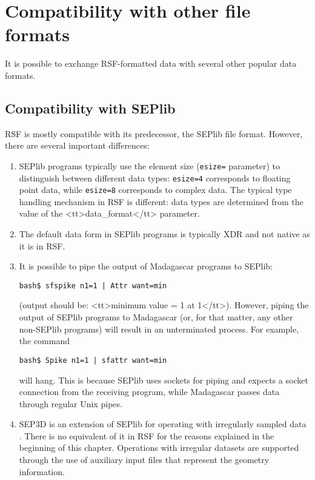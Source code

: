 \section{Compatibility with other file formats}

It is possible to exchange RSF-formatted data with several other popular data formats.

\subsection{Compatibility with SEPlib}

RSF is mostly compatible with its predecessor, the SEPlib file format.
However, there are several important differences:
\begin{enumerate}
\item SEPlib programs typically use the element size (\texttt{esize=}
parameter) to distinguish between different data types:
\texttt{esize=4} corresponds to floating point data, while
\texttt{esize=8} corresponds to complex data. The typical type
handling mechanism in RSF is different: 
data types are determined from the value of the <tt>data\_format</tt> parameter.
\item The default data form in SEPlib programs is
typically XDR and not native as it is in RSF. 
\item It is possible to pipe the
output of Madagascar programs to SEPlib:
\begin{verbatim}
bash$ sfspike n1=1 | Attr want=min
\end{verbatim}
(output should be: <tt>minimum value = 1 at 1</tt>).
However, piping the output of SEPlib programs to Madagascar (or, for that matter, any
other non-SEPlib programs) will result in an unterminated process. For example, the command
\begin{verbatim}
bash$ Spike n1=1 | sfattr want=min
\end{verbatim}
will hang. This is 
because SEPlib uses sockets for piping and expects a socket
connection from the receiving program, while Madagascar passes data through regular Unix
pipes.
\item SEP3D is an extension of SEPlib for operating with irregularly sampled
  data \cite[]{Biondi.sep.92.343}. There is no equivalent of it in RSF for
  the reasons explained in the beginning of this chapter. Operations with
  irregular datasets are supported through the use of auxiliary input files
  that represent the geometry information.
\end{enumerate}

